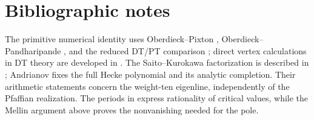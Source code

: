 \section*{Bibliographic notes}
\label{sec:zbps-bibliography}

The primitive numerical identity uses Oberdieck--Pixton
\cite{OB}, Oberdieck--Pandharipande \cite{OPand}, and the reduced
DT/PT comparison \cite{OberdieckReducedPT}; direct vertex
calculations in DT theory are developed in \cite{BRYAN}.
The Saito--Kurokawa factorization is described in \cite{ZagierSK};
Andrianov \cite{Andr74} fixes the full Hecke polynomial and its
analytic completion.  Their arithmetic statements concern the
weight-ten eigenline, independently of the Pfaffian realization.
The periods in \cite{Manin72,KZ,Del79} express rationality of
critical values, while the Mellin argument above proves the
nonvanishing needed for the pole.
